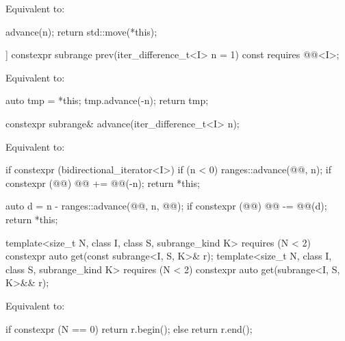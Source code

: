 \begin{itemdescr}
\pnum
\effects
Equivalent to:
\begin{codeblock}
advance(n);
return std::move(*this);
\end{codeblock}
\end{itemdescr}

%
\begin{itemdecl}
[[nodiscard]] constexpr subrange prev(iter_difference_t<I> n = 1) const
  requires @@<I>;
\end{itemdecl}

\begin{itemdescr}
\pnum
\effects
Equivalent to:
\begin{codeblock}
auto tmp = *this;
tmp.advance(-n);
return tmp;
\end{codeblock}
\end{itemdescr}

%
\begin{itemdecl}
constexpr subrange& advance(iter_difference_t<I> n);
\end{itemdecl}

\begin{itemdescr}
\pnum
\effects
Equivalent to:
\begin{codeblock}
if constexpr (bidirectional_iterator<I>) {
  if (n < 0) {
    ranges::advance(@@, n);
    if constexpr (@@)
      @@ += @@(-n);
    return *this;
  }
}

auto d = n - ranges::advance(@@, n, @@);
if constexpr (@@)
  @@ -= @@(d);
return *this;
\end{codeblock}
\end{itemdescr}

%
\begin{itemdecl}
template<size_t N, class I, class S, subrange_kind K>
  requires (N < 2)
  constexpr auto get(const subrange<I, S, K>& r);
template<size_t N, class I, class S, subrange_kind K>
  requires (N < 2)
  constexpr auto get(subrange<I, S, K>&& r);
\end{itemdecl}

\begin{itemdescr}
\pnum
\effects
Equivalent to:
\begin{codeblock}
if constexpr (N == 0)
  return r.begin();
else
  return r.end();
\end{codeblock}
\end{itemdescr}

